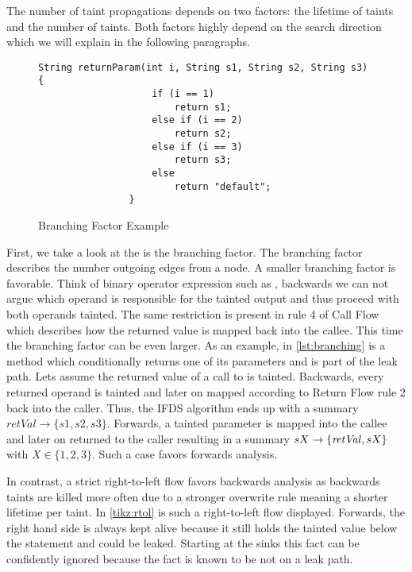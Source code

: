 \documentclass[../draft.tex]{subfiles}
\begin{document}
    The number of taint propagations depends on two factors: the lifetime of taints and the number of taints. Both factors highly depend on the search direction which we will explain in the following paragraphs.

    \begin{figure}[ht]
        \centering
        \begin{adjustbox}{max width=\textwidth}
            \begin{lstlisting}[gobble=16]
                String returnParam(int i, String s1, String s2, String s3) {
                    if (i == 1)
                        return s1;
                    else if (i == 2)
                        return s2;
                    else if (i == 3)
                        return s3;
                    else
                        return "default";
                }
            \end{lstlisting}    
        \end{adjustbox}
        \caption{Branching Factor Example}
        \label{lst:branching}
    \end{figure}

    First, we take a look at the is the branching factor. The branching factor describes the number outgoing edges from a node. A smaller branching factor is favorable.   
    Think of binary operator expression such as , backwards we can not argue which operand is responsible for the tainted output and thus proceed with both operands tainted. The same restriction is present in rule 4 of Call Flow which describes how the returned value is mapped back into the callee. This time the branching factor can be even larger. As an example, in \autoref{lst:branching} is a method which conditionally returns one of its parameters and is part of the leak path. Lets assume the returned value of a call to  is tainted. Backwards, every returned operand is tainted and later on mapped according to Return Flow rule 2 back into the caller. Thus, the IFDS algorithm ends up with a summary $\mathit{retVal} \rightarrow \{s1, s2, s3\}$. Forwards, a tainted parameter is mapped into the callee and later on returned to the caller resulting in a summary $sX \rightarrow \mathit\{\mathit{retVal}, sX\}$ with $X \in \{1,2,3\}$. Such a case favors forwards analysis.

    In contrast, a strict right-to-left flow favors backwards analysis as backwards taints are killed more often due to a stronger overwrite rule meaning a shorter lifetime per taint. In \autoref{tikz:rtol} is such a right-to-left flow displayed. Forwards, the right hand side is always kept alive because it still holds the tainted value below the statement and could be leaked. Starting at the sinks this fact can be confidently ignored because the fact is known to be not on a leak path.
    
\end{document}
